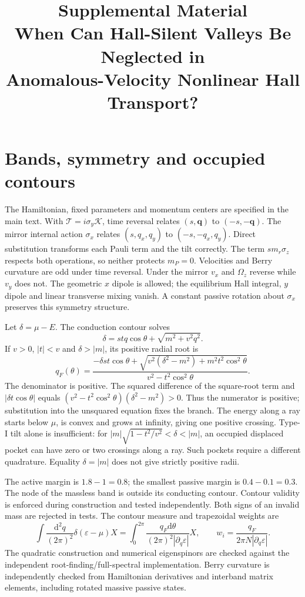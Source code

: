 \documentclass[11pt]{article}
\title{Supplemental Material\\\large When Can Hall-Silent Valleys Be Neglected in\\Anomalous-Velocity Nonlinear Hall Transport?}
\author{}\date{}
\newcommand{\dd}{\mathrm{d}}
\begin{document}
\maketitle
\section{Bands, symmetry and occupied contours}
The Hamiltonian, fixed parameters and momentum centers are specified in the main text. With $\mathcal T=i\sigma_y\mathcal K$, time reversal relates $(s,\bm q)$ to $(-s,-\bm q)$. The mirror internal action $\sigma_x$ relates $(s,q_x,q_y)$ to $(-s,-q_x,q_y)$. Direct substitution transforms each Pauli term and the tilt correctly. The term $s m_r\sigma_z$ respects both operations, so neither protects $m_P=0$. Velocities and Berry curvature are odd under time reversal. Under the mirror $v_x$ and $\Omega_z$ reverse while $v_y$ does not. The geometric $x$ dipole is allowed; the equilibrium Hall integral, $y$ dipole and linear transverse mixing vanish. A constant passive rotation about $\sigma_x$ preserves this symmetry structure.

Let $\delta=\mu-E$. The conduction contour solves
\begin{equation}
\delta=s t q\cos\theta+\sqrt{m^2+v^2q^2}.
\end{equation}
If $v>0$, $|t|<v$ and $\delta>|m|$, its positive radial root is
\begin{equation}
q_F(\theta)=\frac{-\delta st\cos\theta+
\sqrt{v^2(\delta^2-m^2)+m^2t^2\cos^2\theta}}
{v^2-t^2\cos^2\theta}.\label{eq:root}
\end{equation}
The denominator is positive. The squared difference of the square-root term and $|\delta t\cos\theta|$ equals $(v^2-t^2\cos^2\theta)(\delta^2-m^2)>0$. Thus the numerator is positive; substitution into the unsquared equation fixes the branch. The energy along a ray starts below $\mu$, is convex and grows at infinity, giving one positive crossing. Type-I tilt alone is insufficient: for $|m|\sqrt{1-t^2/v^2}<\delta<|m|$, an occupied displaced pocket can have zero or two crossings along a ray. Such pockets require a different quadrature. Equality $\delta=|m|$ does not give strictly positive radii.

The active margin is $1.8-1=0.8$; the smallest passive margin is $0.4-0.1=0.3$. The node of the massless band is outside its conducting contour. Contour validity is enforced during construction and tested independently. Both signs of an invalid mass are rejected in tests. The contour measure and trapezoidal weights are
\begin{equation}
\int\frac{\dd^2q}{(2\pi)^2}\delta(\varepsilon-\mu)X
=\int_0^{2\pi}\frac{q_F\dd\theta}{(2\pi)^2|\partial_q\varepsilon|}X,
\qquad w_i=\frac{q_F}{2\pi N|\partial_q\varepsilon|}.
\end{equation}
The quadratic construction and numerical eigenspinors are checked against the independent root-finding/full-spectral implementation. Berry curvature is independently checked from Hamiltonian derivatives and interband matrix elements, including rotated massive passive states.
\end{document}
